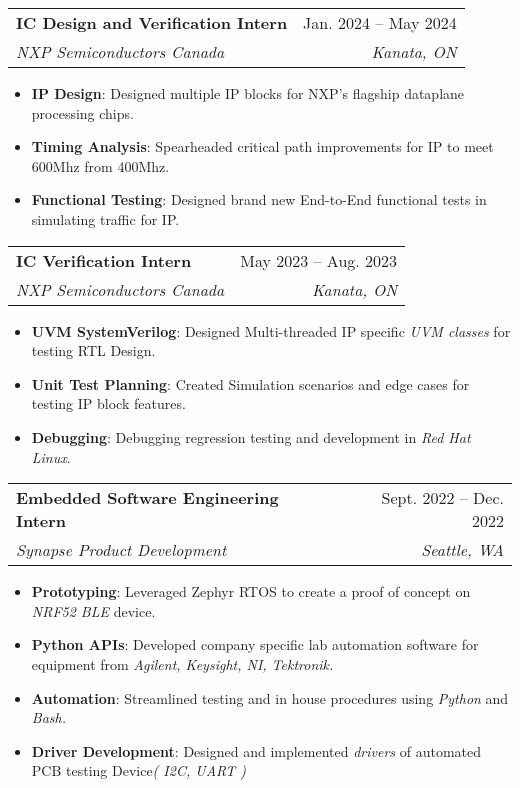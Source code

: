 \documentclass[letterpaper,11pt]{article}
\makeatletter
\newcommand{\resumeItem}[1]{
  \item\small{
    {#1 \vspace{-2pt}}
  }
}
\newcommand{\resumeSubheading}[4]{
  \vspace{-1pt}\item
    \begin{tabular*}{0.97\textwidth}[t]{l@{\extracolsep{\fill}}r}
      \textbf{#1} & #2 \\
      \textit{\small#3} & \textit{\small #4} \\
    \end{tabular*}\vspace{-7pt}
}
\newcommand{\resumeSubSubheading}[2]{
    \item
    \begin{tabular*}{0.97\textwidth}{l@{\extracolsep{\fill}}r}
      \textit{\small#1} & \textit{\small #2} \\
    \end{tabular*}\vspace{-7pt}
}
\newcommand{\resumeSubHeadingListEnd}{\end{itemize}}
\newcommand{\resumeItemListStart}{\begin{itemize}}
\newcommand{\resumeItemListEnd}{\end{itemize}\vspace{-5pt}}
\makeatother
\begin{document}
    \resumeSubheading
      {IC Design and Verification Intern}{Jan. 2024 -- May 2024}
      {NXP Semiconductors Canada}{Kanata, ON}
      \resumeItemListStart
      \resumeItem {\textbf{IP Design}: Designed multiple IP blocks for NXP's flagship dataplane processing chips.} 
      \resumeItem {\textbf{Timing Analysis}: Spearheaded critical path improvements for IP to meet 600Mhz from 400Mhz.} 
      \resumeItem {\textbf{Functional Testing}: Designed brand new End-to-End functional tests in simulating traffic for IP.}
      \resumeItemListEnd
     \resumeSubheading
      {IC Verification Intern}{May 2023 -- Aug. 2023}
      {NXP Semiconductors Canada}{Kanata, ON}
      \resumeItemListStart
      \resumeItem {\textbf{UVM SystemVerilog}: Designed Multi-threaded IP specific \emph{UVM classes} for testing RTL Design.} 
      \resumeItem {\textbf{Unit Test Planning}: Created Simulation scenarios and edge cases for testing IP block features.} 
      \resumeItem {\textbf{Debugging}: Debugging regression testing and development in \emph{Red Hat Linux}.} 
      \resumeItemListEnd
    
    \resumeSubheading
      {Embedded Software Engineering Intern}{Sept. 2022 -- Dec. 2022}
      {Synapse Product Development}{Seattle, WA}
      \resumeItemListStart
        \resumeItem {\textbf{Prototyping}: Leveraged {Zephyr RTOS} to create a proof of concept on \textit{NRF52 BLE} device.}
        \resumeItem {\textbf{Python APIs}: Developed company specific lab automation software for equipment from \textit{Agilent, Keysight, NI, Tektronik.}}
        \resumeItem {\textbf{Automation}: Streamlined testing and in house procedures using \textit{Python} and \textit{Bash.}} 
        \resumeItem {\textbf{Driver Development}: Designed and implemented \textit{drivers} of automated PCB testing Device\textit{( I2C, UART )}}
      \resumeItemListEnd
     
\end{document}
